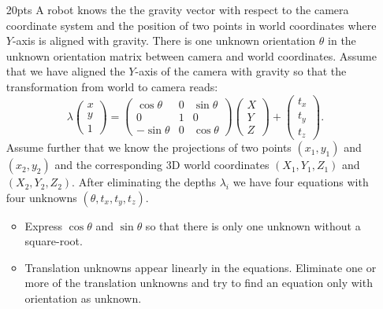 \documentclass[11pt,english]{article}
\begin{document}
\begin{enumerate}
\item[20pts]
A robot knows the the gravity vector with respect to the camera coordinate system and the position of two points in world coordinates where $Y$-axis is aligned with gravity. 
There is one unknown orientation $\theta$ in the unknown orientation matrix between camera and world coordinates. Assume that we have aligned the $Y$-axis of the camera with gravity so that the transformation from world to camera reads:
\[
\lambda \begin{pmatrix} x \\ y \\ 1 \end{pmatrix}  = \begin{pmatrix} \cos\theta & 0 & \sin\theta 
\\ 0 & 1 & 0 
\\ -\sin\theta & 0 & \cos\theta
\end{pmatrix}
 \begin{pmatrix} X \\ Y \\ Z \end{pmatrix} + \begin{pmatrix} t_x \\ t_y \\ t_z \end{pmatrix}.
 \]
Assume further that we know the projections of two points $(x_1,y_1)$ and $(x_2,y_2)$ 
and the corresponding 3D world coordinates $(X_1,Y_1,Z_1)$ and $(X_2,Y_2,Z_2)$.
After eliminating the depths $\lambda_i$ we have four equations with four unknowns 
$(\theta,t_x,t_y,t_z)$.
\begin{itemize}
\item
Express $\cos\theta$ and $\sin\theta$ so that there is only one unknown without a square-root.
\item
Translation unknowns appear linearly in the equations. Eliminate one or more of the translation unknowns and try to find an equation only with orientation as unknown.
\end{itemize}
\end{enumerate}
\end{document}
